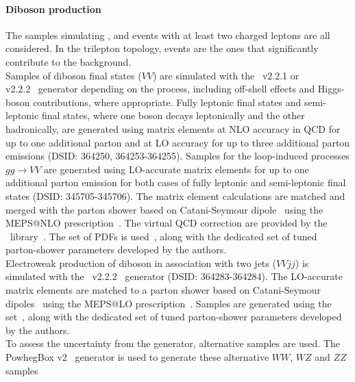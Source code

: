 \paragraph{Diboson production} 
The samples simulating \PW{}\PW, \PW{}\PZ and \PZ{}\PZ events with at least two charged leptons are all considered.
In the trilepton topology, \PW{}\PZ events are the ones that significantly contribute to the background.\\
Samples of diboson final states ($VV$) are simulated with the
\sherpa~v2.2.1 or \\v2.2.2~\cite{Bothmann:2019yzt} generator depending on the process,
including off-shell effects and Higgs-boson contributions, where appropriate.
Fully leptonic final states and semi-leptonic final states, where one boson
decays leptonically and the other hadronically, are generated using
matrix elements at NLO accuracy in QCD for up to one additional parton
and at LO accuracy for up to three additional parton
emissions (DSID\@: 364250, 364253-364255). Samples for the loop-induced processes $gg \to VV$ are
generated using LO-accurate matrix elements for up to one
additional parton emission for both cases of fully leptonic and
semi-leptonic final states (DSID\@: 345705-345706). The matrix element calculations are matched
and merged with the \sherpa parton shower based on Catani-Seymour
dipole~\cite{Gleisberg:2008fv,Schumann:2007mg} using the MEPS@NLO
prescription~\cite{Hoeche:2011fd,Hoeche:2012yf,Catani:2001cc,Hoeche:2009rj}.
The virtual QCD correction are provided by the
\openloops\ library~\cite{Cascioli:2011va,Denner:2016kdg}. The
\nnpdfnnlo set of PDFs is used~\cite{Ball:2014uwa}, along with the
dedicated set of tuned parton-shower parameters developed by the
\sherpa authors.\\
Electroweak production of diboson in association with two jets
($VVjj$) is simulated with the \sherpa~v2.2.2~\cite{Bothmann:2019yzt}
generator (DSID\@: 364283-364284). The LO-accurate matrix elements are matched to a parton
shower based on Catani-Seymour dipoles~\cite{Gleisberg:2008fv,Schumann:2007mg} using the MEPS@LO
prescription~\cite{Hoeche:2011fd,Hoeche:2012yf,Catani:2001cc,Hoeche:2009rj}.
Samples are generated using the \nnpdfnnlo set~\cite{Ball:2014uwa},
along with the dedicated set of tuned parton-shower parameters
developed by the \sherpa authors.\\
To assess the uncertainty from the generator, alternative samples are used. 
The PowhegBox v2~\cite{Nason:2004rx,Frixione:2007vw,Alioli:2010xd} generator
is used to generate these alternative $WW$, $WZ$ and $ZZ$ samples~\cite{Nason:2013ydw}
